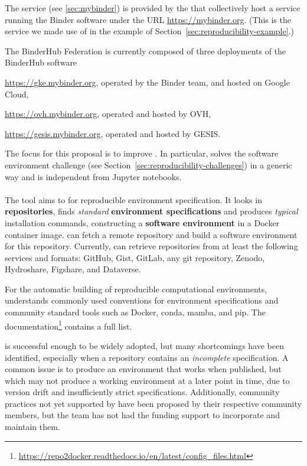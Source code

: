 The \emph{\mybinder{}} service (see \ref{sec:mybinder}) is provided by the  that collectively host a service running the Binder software
under the URL \url{https://mybinder.org}. (This is the service we made use of in the example
of Section~\ref{sec:reproducibility-example}.)

The BinderHub Federation is currently composed of three deployments of the BinderHub software

\begin{compactitem}
\item \url{https://gke.mybinder.org}, operated by the Binder team, and hosted on Google Cloud,
\item \url{https://ovh.mybinder.org}, operated and hosted by OVH,
\item \url{https://gesis.mybinder.org}, operated and hosted by GESIS.
\end{compactitem}

The focus for this proposal is to improve \repotodocker{}. In particular,
\repotodocker{} solves the software environment challenge (see
Section~\ref{sec:reproducibility-challenges}) in a generic way and is independent
from Jupyter notebooks.


\paragraph{\repotodocker}\label{sec:repo2docker}
The \repotodocker{} tool aims to  for reproducible environment specification.
It looks in \textbf{repositories}, finds \emph{standard} \textbf{environment specifications} and produces \emph{typical} installation commands,
constructing a \textbf{software environment} in a Docker container image.
\repotodocker{} can fetch a remote repository and build a software
environment for this repository. Currently, \repotodocker{} can retrieve
repositories from at least the following services and formats: GitHub, Gist, GitLab, any git repository,
Zenodo, Hydroshare, Figshare, and Dataverse.

For the automatic building of reproducible computational environments,
\repotodocker{} understands commonly used conventions for environment specifications and
community standard tools such as Docker, conda, mamba, and pip.
The
documentation\footnote{\url{https://repo2docker.readthedocs.io/en/latest/config_files.html}}
  contains a full list.

\repotodocker{} is successful enough to be widely adopted,
but many shortcomings have been identified,
especially when a repository contains an \emph{incomplete} specification.
A common issue is to produce an environment that works when published,
but which may not produce a working environment at a later point in time,
due to version drift and insufficiently strict specifications.
Additionally, community practices not yet supported by \repotodocker{} have been proposed by their respective community members,
but the \repotodocker{} team has not had the funding support to incorporate and maintain them.

